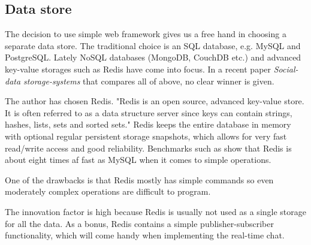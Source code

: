 \documentclass[12pt,oneside]{fithesis}
\begin{document}
	\subsection{Data store}		
		The decision to use simple web framework gives us a free hand in choosing a separate data store. The traditional choice is an SQL database, e.g. MySQL and PostgreSQL. Lately NoSQL databases (MongoDB, CouchDB etc.) and  advanced key-value storages such as Redis have come into focus. In a recent paper \emph{Social-data storage-systems} \cite{Ruflin2011} that compares all of above, no clear winner is given.
		
		The author has chosen Redis. "Redis is an open source, advanced key-value store. It is often referred to as a data structure server since keys can contain strings, hashes, lists, sets and sorted sets."\cite{website:redis} Redis keeps the entire database in memory with optional regular persistent storage snapshots, which allows for very fast read/write access and good reliability.	Benchmarks such as \cite{website:ruturaj} show that Redis is about eight times af fast as MySQL when it comes to simple operations.
		
		One of the drawbacks is that Redis mostly has simple commands so even moderately complex operations are difficult to program.
		
		The innovation factor is high because Redis is usually not used as a single storage for all the data. As a bonus, Redis contains a simple publisher-subscriber functionality, which will come handy when implementing the real-time chat.
\end{document}
